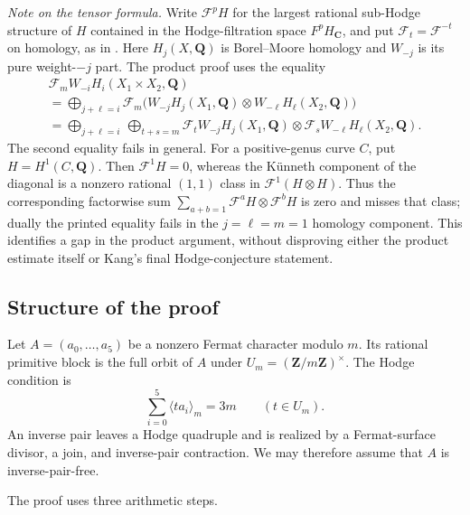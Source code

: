 \documentclass[11pt]{amsart}
\numberwithin{theorem}{section}
\theoremstyle{remark}
\numberwithin{equation}{section}
\begin{document}
\emph{Note on the tensor formula.} Write \(\mathcal F^pH\) for the largest
rational sub-Hodge structure of \(H\) contained in the Hodge-filtration
space \(F^pH_{\mathbf C}\), and put \(\mathcal F_t=\mathcal F^{-t}\)
on homology, as in \cite[pp.~520--521]{kang2015}. Here \(H_j(X,\mathbf Q)\) is
Borel--Moore homology and \(W_{-j}\) is its pure weight-\(-j\) part.
The product proof \cite[p.~522]{kang2015} uses the equality
\[
\begin{gathered}
\mathcal F_m W_{-i}H_i(X_1\times X_2,\mathbf Q)
\\=\bigoplus_{j+\ell=i}\mathcal F_m
  \bigl(W_{-j}H_j(X_1,\mathbf Q)\otimes W_{-\ell}H_\ell(X_2,\mathbf Q)\bigr)\\
=\bigoplus_{j+\ell=i}\ \bigoplus_{t+s=m}
  \mathcal F_tW_{-j}H_j(X_1,\mathbf Q)\otimes
  \mathcal F_sW_{-\ell}H_\ell(X_2,\mathbf Q).
\end{gathered}
\]
The second equality fails in general. For a positive-genus curve \(C\),
put \(H=H^1(C,\mathbf Q)\). Then \(\mathcal F^1H=0\), whereas
the Künneth component of the diagonal is a nonzero rational \((1,1)\)
class in \(\mathcal F^1(H\otimes H)\). Thus the corresponding
factorwise sum \(\sum_{a+b=1}\mathcal F^aH\otimes\mathcal F^bH\)
is zero and misses that class; dually the printed equality fails in the
\(j=\ell=m=1\) homology component. This identifies a gap in the
product argument, without disproving either the product estimate itself
or Kang's final Hodge-conjecture statement.

\subsection{Structure of the proof}\label{sec:1.2}

Let \(A=(a_0,\ldots,a_5)\) be a nonzero Fermat character modulo \(m\).
Its rational primitive block is the full orbit of \(A\) under
\(U_m=(\mathbf Z/m\mathbf Z)^\times\). The Hodge condition is
\[
\sum_{i=0}^5\langle ta_i\rangle_m=3m\qquad(t\in U_m).
\tag{1.1}\label{eq:1.1}
\]
An inverse pair leaves a Hodge quadruple and is realized by a
Fermat-surface divisor, a join, and inverse-pair contraction. We may
therefore assume that \(A\) is inverse-pair-free.

The proof uses three arithmetic steps.
\end{document}
